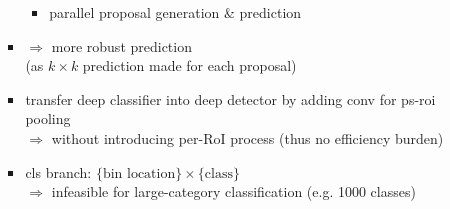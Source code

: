\begin{itemize}
\begin{itemize}
\begin{itemize}
\begin{itemize}
			\item parallel proposal generation \& prediction
			\end{itemize}
		\item $\Rightarrow$ more robust prediction \\
		(as $k\times k$ prediction made for each proposal)
		\item transfer deep classifier into deep detector by adding conv for ps-roi pooling \\
		$\Rightarrow$ without introducing per-RoI process (thus no efficiency burden)
		\item cls branch: $\{\text{bin location}\}\times\{\text{class}\}$ \\
		$\Rightarrow$ infeasible for large-category classification (e.g. 1000 classes)
		\end{itemize}
	\end{itemize}
	

\end{itemize}

